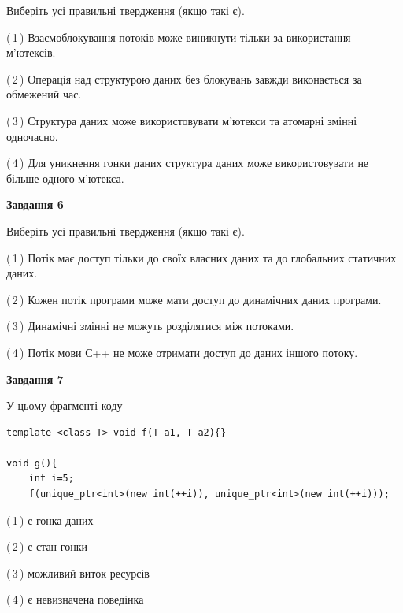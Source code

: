 \documentclass[12pt, ukrainian]{article}
\begin{document}
\begin {large}
{Виберіть усі правильні твердження (якщо такі є).\par
\vspace{2mm}

(\,1\,) Взаємоблокування потоків може виникнути тільки за використання м’ютексів.%

(\,2\,) Операція над структурою даних без блокувань завжди виконається за обмежений час.%

(\,3\,) Структура даних може використовувати м’ютекси та атомарні змінні одночасно.%

(\,4\,) Для уникнення гонки даних структура даних може використовувати не більше одного м’ютекса.%
\newpage


\begin{center}
\textbf{Завдання 6}
\end{center}

Виберіть усі правильні твердження (якщо такі є).\par
\vspace{2mm}

(\,1\,) Потік має доступ тільки до своїх власних даних та до глобальних статичних даних.%

(\,2\,) Кожен потік програми може мати доступ до динамічних даних програми.%

(\,3\,) Динамічні змінні не можуть розділятися між потоками.%

(\,4\,) Потік мови С++ не може отримати доступ до даних іншого потоку.%


\begin{center}
\textbf{Завдання 7}
\end{center}

У цьому фрагменті коду
\begin{verbatim}
template <class T> void f(T a1, T a2){}

void g(){
    int i=5;
    f(unique_ptr<int>(new int(++i)), unique_ptr<int>(new int(++i)));
\end{verbatim}

(\,1\,) є гонка даних%

(\,2\,) є стан гонки%

(\,3\,) можливий виток ресурсів%

(\,4\,) є невизначена поведінка%

}
\end {large}

\vspace{4mm}
\newpage
\end{document}
